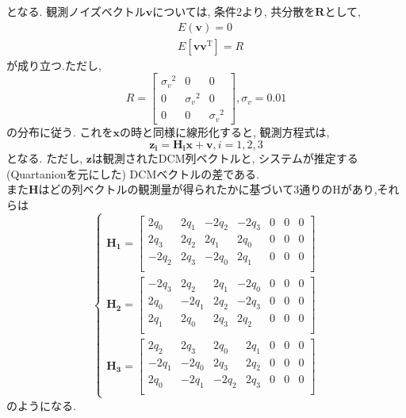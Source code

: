 \documentclass[class=article, crop=false, dvipdfmx, fleqn]{standalone}
\begin{document}
となる.
観測ノイズベクトル$\bm{v}$については, 条件2より, 共分散を$\bm{R}$として,
\begin{align}
   &E(\bm{v}) = 0 \\
   &E[\bm{v}{\bm{v}}^{\mathrm{T}}] = R
\end{align}
が成り立つ.ただし,
\begin{equation}
   R =
  \begin{bmatrix}
    {\sigma_v}^2 & 0 & 0 \\
    0 & {\sigma_v}^2 & 0 \\
    0 & 0 & {\sigma_v}^2
  \end{bmatrix}
  ,  {\sigma_v} = 0.01
\end{equation}
の分布に従う. これを$\bm{x}$の時と同様に線形化すると, 観測方程式は,
\begin{equation}
  \bm{z_i} = \bm{H_i}\bm{x} + \bm{v}, i=1,2,3
\end{equation}
となる. ただし, $\bm{z}$は観測されたDCM列ベクトルと, システムが推定する(Quartanionを元にした)
DCMベクトルの差である. \\
また$\bm{H}$はどの列ベクトルの観測量が得られたかに基づいて3通りのHがあり,それらは
\begin{equation}
  \begin{cases}
  \bm{H_1} =
  \begin{bmatrix}
    2q_0 & 2q_1 & -2q_2 & -2q_3 & 0 & 0 & 0 \\
    2q_3 & 2q_2 & 2q_1 & 2q_0 & 0 & 0 & 0 \\
    -2q_2 & 2q_3 & -2q_0 & 2q_1 & 0 & 0 & 0 \\
  \end{bmatrix} \\
  \bm{H_2} =
  \begin{bmatrix}
    -2q_3 & 2q_2 & 2q_1 & -2q_0 & 0 & 0 & 0 \\
    2q_0 & -2q_1 & 2q_2 & -2q_3 & 0 & 0 & 0 \\
    2q_1 & 2q_0 & 2q_3 & 2q_2 & 0 & 0 & 0 \\
  \end{bmatrix} \\
  \bm{H_3} =
  \begin{bmatrix}
    2q_2 & 2q_3 & 2q_0 & 2q_1 & 0 & 0 & 0 \\
    -2q_1 & -2q_0 & 2q_3 & 2q_2 & 0 & 0 & 0 \\
    2q_0 & -2q_1 & -2q_2 & 2q_3 & 0 & 0 & 0 \\
  \end{bmatrix}
  \end{cases}
\end{equation}
のようになる.
\end{document}

